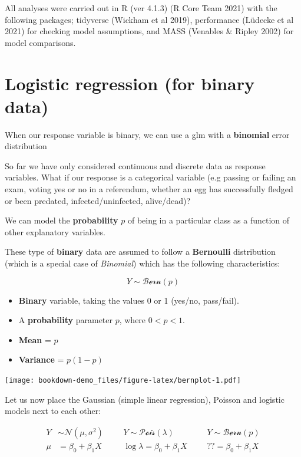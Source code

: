 \documentclass[
]{book}
\providecommand{\tightlist}{%
  \setlength{\itemsep}{0pt}\setlength{\parskip}{0pt}}
\begin{document}
All analyses were carried out in R (ver 4.1.3) (R Core Team 2021) with the following packages; tidyverse (Wickham et al 2019), performance (Lüdecke et al 2021) for checking model assumptions, and MASS (Venables \& Ripley 2002) for model comparisons.

\hypertarget{logistic-regression-for-binary-data}{%
\section{Logistic regression (for binary data)}\label{logistic-regression-for-binary-data}}

When our response variable is binary, we can use a glm with a \textbf{binomial} error distribution

So far we have only considered continuous and discrete data as response variables. What if our response is a categorical variable (e.g passing or failing an exam, voting yes or no in a referendum, whether an egg has successfully fledged or been predated, infected/uninfected, alive/dead)?

We can model the \textbf{probability} \(p\) of being in a particular class as a function of other
explanatory variables.

These type of \textbf{binary} data are assumed to follow a \textbf{Bernoulli} distribution (which is a special case of \emph{Binomial}) which has the following characteristics:

\[
Y \sim \mathcal{Bern}(p)
\]

\begin{itemize}
\tightlist
\item
  \textbf{Binary} variable, taking the values 0 or 1 (yes/no, pass/fail).
\item
  A \textbf{probability} parameter \(p\), where \(0 < p < 1\).
\item
  \textbf{Mean} = \(p\)\\
\item
  \textbf{Variance} = \(p(1 - p)\)
\end{itemize}

\texttt{[image: bookdown-demo\_files/figure-latex/bernplot-1.pdf]}

Let us now place the Gaussian (simple linear regression), Poisson and logistic models next to each other:

\[
\begin{aligned}
Y & \sim \mathcal{N}(\mu, \sigma^2) &&& Y  \sim \mathcal{Pois}(\lambda) &&& Y  \sim \mathcal{Bern}(p)\\
\mu & = \beta_0 + \beta_1X &&& \log{\lambda} = \beta_0 + \beta_1X &&& ?? = \beta_0 + \beta_1X
\end{aligned}
\]
\end{document}
